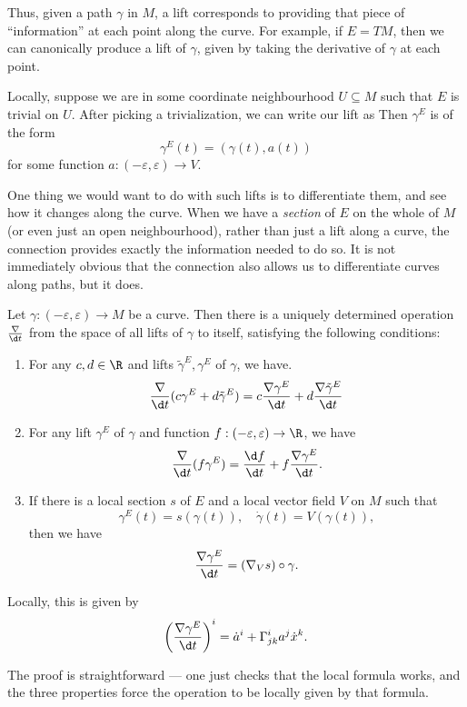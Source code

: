 \documentclass[a4paper]{article}
\begin{document}
Thus, given a path $\gamma$ in $M$, a lift corresponds to providing that piece of ``information'' at each point along the curve. For example, if $E = TM$, then we can canonically produce a lift of $\gamma$, given by taking the derivative of $\gamma$ at each point.

Locally, suppose we are in some coordinate neighbourhood $U \subseteq M$ such that $E$ is trivial on $U$. After picking a trivialization, we can write our lift as
 Then $\gamma^E$ is of the form
\[
  \gamma^E(t) = (\gamma(t), a(t))
\]
for some function $a: (-\varepsilon, \varepsilon) \to V$.

One thing we would want to do with such lifts is to differentiate them, and see how it changes along the curve. When we have a \emph{section} of $E$ on the whole of $M$ (or even just an open neighbourhood), rather than just a lift along a curve, the connection provides exactly the information needed to do so. It is not immediately obvious that the connection also allows us to differentiate curves along paths, but it does.

\begin{prop}
  Let $\gamma: (-\varepsilon, \varepsilon) \to M$ be a curve. Then there is a uniquely determined operation $\frac{\nabla}{\d t}$ from the space of all lifts of $\gamma$ to itself, satisfying the following conditions:
  \begin{enumerate}
    \item For any $c, d \in \R$ and lifts $\tilde{\gamma}^E, \gamma^E$ of $\gamma$, we have.
      \[
        \frac{\nabla}{\d t}(c\gamma^E + d \tilde{\gamma}^E) = c\frac{\nabla \gamma^E}{\d t} + d \frac{\nabla \tilde{\gamma}^E}{\d t}
      \]
    \item For any lift $\gamma^E$ of $\gamma$ and function $f: (-\varepsilon, \varepsilon) \to \R$, we have
      \[
        \frac{\nabla}{\d t}(f \gamma^E) = \frac{\d f}{\d t} + f \frac{\nabla \gamma^E}{\d t}.
      \]
    \item If there is a local section $s$ of $E$ and a local vector field $V$ on $M$ such that
      \[
        \gamma^E(t) = s(\gamma(t)),\quad \dot{\gamma}(t) = V(\gamma(t)),
      \]
      then we have
      \[
        \frac{\nabla \gamma^E}{\d t} = (\nabla_V s) \circ \gamma.
      \]
  \end{enumerate}
  Locally, this is given by
  \[
    \left(\frac{\nabla \gamma^E}{\d t}\right)^i = \dot{a}^i + \Gamma^i_{jk} a^j \dot{x}^k.
  \]
\end{prop}
The proof is straightforward --- one just checks that the local formula works, and the three properties force the operation to be locally given by that formula.
\end{document}
